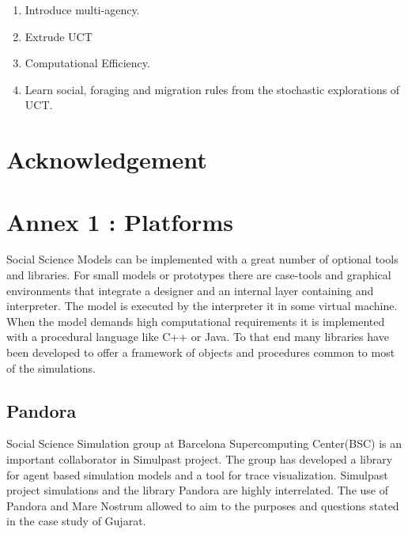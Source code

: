 \documentclass[11pt,oneside,a4paper,openright]{report}
\begin{document}
\begin{enumerate}

	\item Introduce multi-agency.
	
	\item Extrude UCT
	
	\item Computational Efficiency.
	
	\item Learn social, foraging and migration rules from the stochastic explorations of UCT.
	
\end{enumerate}




\chapter{Acknowledgement}



\chapter{Annex 1 : Platforms}

Social Science Models can be implemented with a great number of optional tools and libraries.
For small models or prototypes there are case-tools and graphical environments that 
integrate a designer and an internal layer containing and interpreter. The model is executed
by the interpreter it in some virtual machine. When the model demands high computational 
requirements it is implemented with a procedural language like C++ or Java. To that end many 
libraries have been developed to offer a framework of objects and procedures common to most of the simulations.

\section{Pandora}

Social Science Simulation group at Barcelona Supercomputing Center(BSC) is an important collaborator
in Simulpast project. The group has developed a library for agent based simulation models and a tool for 
trace visualization. Simulpast project simulations and the library Pandora are highly interrelated. The use 
of Pandora and Mare Nostrum allowed to aim to the purposes and questions stated in the case study of Gujarat.
\end{document}

